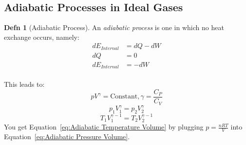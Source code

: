 \documentclass[10pt,letterpaper,final,twoside,notitlepage]{article}
\numberwithin{equation}{section} %
\theoremstyle{definition}
\newtheorem{definition}{Defn} %
\theoremstyle{remark}
\begin{document}
	\subsection*{Adiabatic Processes in Ideal Gases} \label{subsec:Adiabatic Processes in Ideal Gases}
		\begin{definition}[Adiabatic Process] \label{def:Adiabatic Processes in Ideal Gases}
			An \emph{adiabatic process} is one in which no heat exchange occurs, namely:
			\begin{equation} \label{eq:Adiabatic Processes in Ideal Gases}
				\begin{aligned}
					dE_{Internal} &= dQ - dW \\
					dQ &= 0 \\
					dE_{Internal} &= -dW \\
				\end{aligned}
			\end{equation}
		\end{definition}
		This leads to:
		\begin{equation}
			pV^{\gamma} = \text{Constant}, \gamma = \frac{C_{P}}{C_{V}}
		\end{equation}
		\begin{equation} \label{eq:Adiabatic Pressure Volume}
			p_{1}V_{1}^{\gamma} = p_{2}V_{2}^{\gamma}
		\end{equation}
		\begin{equation} \label{eq:Adiabatic Temperature Volume}
			T_{1}V_{1}^{\gamma -1} = T_{2}V_{2}^{\gamma -1} 
		\end{equation}
		You get Equation~\eqref{eq:Adiabatic Temperature Volume} by plugging $p = \frac{nRT}{V}$ into Equation~\eqref{eq:Adiabatic Pressure Volume}.
		
\end{document}
